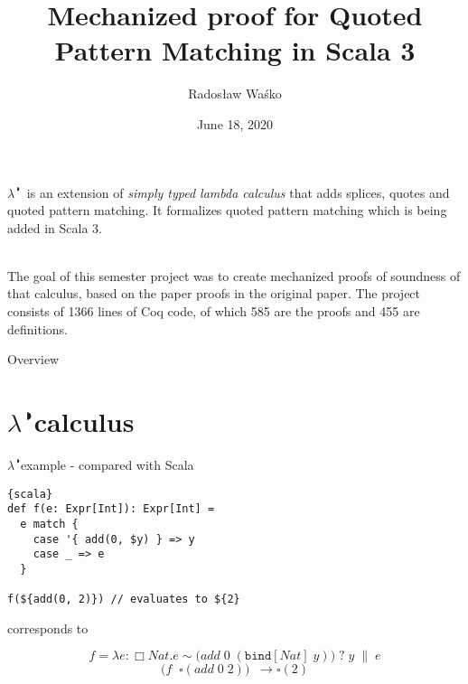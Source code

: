 \documentclass{beamer}
\title{Mechanized proof for Quoted Pattern Matching in Scala 3}
\author{Radosław Waśko}
\date{June 18, 2020}
\newcommand{\calculus}{$\lambda^{\RIGHTcircle}$}
\newcommand{\qtype}[1]{\Box#1}
\newcommand{\app}[2]{#1\;#2}
\newcommand{\patnat}[1]{#1}
\newcommand{\patapp}[2]{#1\;#2}
\newcommand{\patbind}[2]{\texttt{bind}[#2]\;#1}
\newcommand{\patmat}[4]{\patmatSP{#1}{#2}\patmatThen{#3}#4}
\newcommand{\patmatSP}[2]{#1 \sim #2\;?}
\newcommand{\patmatThen}[1]{\;#1\; \| \;}
\newcommand{\lam}[3]{\lambda#1{:}#2.#3}
\begin{document}
  \begin{frame}
  \titlepage
\end{frame}
\begin{frame}
  \calculus \, is an extension of \textit{simply typed lambda calculus} that adds splices, quotes and quoted pattern matching. It formalizes quoted pattern matching which is being added in Scala 3. \\~\
  
  The goal of this semester project was to create mechanized proofs of soundness of that calculus, based on the paper proofs in the original paper. The project consists of 1366 lines of Coq code, of which 585 are the proofs and 455 are definitions.
\end{frame}
\begin{frame}{Overview}
  \tableofcontents
\end{frame}

\section{\calculus calculus}
\begin{frame}[fragile]{\calculus example - compared with Scala}

\begin{lstlisting}{scala}
def f(e: Expr[Int]): Expr[Int] =
  e match {
    case '{ add(0, $y) } => y
    case _ => e
  }

f(${add(0, 2)}) // evaluates to ${2}
\end{lstlisting}

corresponds to

\begin{equation*}
f = \lam{e}{\qtype{Nat}}{\patmat{e}{\big( \patapp{\patapp{add}{\patnat{0}}}{(\patbind{y}{Nat})} \big)}{y}{e}}
\end{equation*}
\begin{equation*}
\big(\app{f \;}{\square(\app{\app{add}{0}}{2})} \big) \;\; \longrightarrow \square(2)
\end{equation*}
\end{frame}
\end{document}
